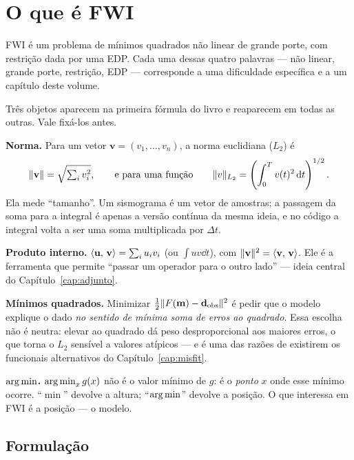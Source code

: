 \documentclass[11pt,a4paper,oneside]{report}
\begin{document}
\chapter{O que \'e FWI}
\label{cap:oque}

\begin{ideia}
FWI \'e um problema de m\'inimos quadrados n\~ao linear de grande porte, com
restri\c{c}\~ao dada por uma EDP. Cada uma dessas quatro palavras --- n\~ao
linear, grande porte, restri\c{c}\~ao, EDP --- corresponde a uma
dificuldade espec\'ifica e a um cap\'itulo deste volume.
\end{ideia}

\begin{matematica}
Tr\^es objetos aparecem na primeira f\'ormula do livro e reaparecem em todas
as outras. Vale fix\'a-los antes.

\textbf{Norma.} Para um vetor $\mathbf{v} = (v_1,\dots,v_n)$, a norma
euclidiana ($L_2$) \'e
\[
\norm{\mathbf{v}} = \sqrt{\textstyle\sum_i v_i^{2}},
\qquad\text{e para uma fun\c{c}\~ao}\qquad
\norm{v}_{L_2} = \left(\int_0^T v(t)^{2}\dd t\right)^{1/2}.
\]
Ela mede ``tamanho''. Um sismograma \'e um vetor de amostras; a passagem da
soma para a integral \'e apenas a vers\~ao cont\'inua da mesma ideia, e no
c\'odigo a integral volta a ser uma soma multiplicada por $\Delta t$.

\textbf{Produto interno.} $\langle \mathbf{u},\,\mathbf{v}\rangle = \sum_i u_i v_i$
(ou $\int u v \dd t$), com $\lVert \mathbf{v} \rVert^{2} =
\langle \mathbf{v},\,\mathbf{v}\rangle$. Ele \'e a ferramenta que permite ``passar um
operador para o outro lado'' --- ideia central do Cap\'itulo~\ref{cap:adjunto}.

\textbf{M\'inimos quadrados.} Minimizar
$\tfrac12\lVert F(\mathbf{m})-\mathbf{d}_{\mathrm{obs}} \rVert^{2}$ \'e pedir que o modelo explique o dado
\emph{no sentido de m\'inima soma de erros ao quadrado}. Essa escolha n\~ao
\'e neutra: elevar ao quadrado d\'a peso desproporcional aos maiores erros, o
que torna o $L_2$ sens\'ivel a valores at\'ipicos --- e \'e uma das raz\~oes de
existirem os funcionais alternativos do Cap\'itulo~\ref{cap:misfit}.

\textbf{$\operatorname*{arg\,min}$.} $\operatorname*{arg\,min}_x g(x)$ n\~ao \'e o valor m\'inimo de $g$: \'e o
\emph{ponto} $x$ onde esse m\'inimo ocorre. ``$\min$'' devolve a altura;
``$\operatorname*{arg\,min}$'' devolve a posi\c{c}\~ao. O que interessa em FWI \'e a
posi\c{c}\~ao --- o modelo.
\end{matematica}

\section{Formula\c{c}\~ao}
\end{document}
